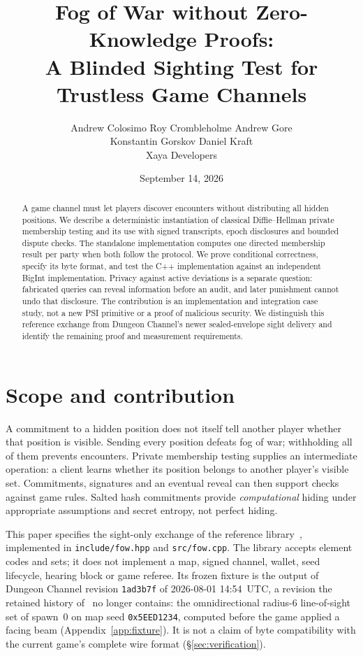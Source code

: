 \documentclass[11pt]{article}
\title{Fog of War without Zero-Knowledge Proofs:\\
A Blinded Sighting Test for Trustless Game Channels}
\author{Andrew Colosimo \quad Roy Crombleholme \quad Andrew Gore\\[3pt]
Konstantin Gorskov \quad Daniel Kraft\\[6pt]
\normalsize Xaya Developers}
\date{September 14, 2026}
\begin{document}
\maketitle

\begin{abstract}
A game channel must let players discover encounters without distributing all
hidden positions. We describe a deterministic instantiation of classical
Diffie--Hellman private membership testing and its use with signed transcripts,
epoch disclosures and bounded dispute checks. The standalone implementation
computes one directed membership result per party when both follow the
protocol. We prove conditional correctness, specify its byte format, and test
the C++ implementation against an independent BigInt implementation. Privacy
against active deviations is a separate question: fabricated queries can reveal
information before an audit, and later punishment cannot undo that disclosure.
The contribution is an implementation and integration case study, not a new
PSI primitive or a proof of malicious security. We distinguish this reference
exchange from Dungeon Channel's newer sealed-envelope sight delivery and
identify the remaining proof and measurement requirements.
\end{abstract}

\section{Scope and contribution}
\label{sec:scope}

A commitment to a hidden position does not itself tell another player whether
that position is visible. Sending every position defeats fog of war; withholding
all of them prevents encounters. Private membership testing supplies an
intermediate operation: a client learns whether its position belongs to another
player's visible set. Commitments, signatures and an eventual reveal can then
support checks against game rules. Salted hash commitments provide
\emph{computational} hiding under appropriate assumptions and secret entropy,
not perfect hiding.

This paper specifies the sight-only exchange of the reference
library~\cite{fowrepo}, implemented in \texttt{include/fow.hpp} and
\texttt{src/fow.cpp}. The library
accepts element codes and sets; it does not implement a map, signed channel,
wallet, seed lifecycle, hearing block or game referee. Its frozen fixture is
the output of Dungeon Channel revision \texttt{1ad3b7f} of 2026-08-01
14:54~UTC, a revision the retained history of~\cite{dchrepo} no longer
contains: the omnidirectional radius-6 line-of-sight set of spawn~0 on map
seed \texttt{0x5EED1234}, computed before the game applied a facing beam
(Appendix~\ref{app:fixture}). It is not a claim of byte compatibility with
the current game's complete wire format (\S\ref{sec:verification}).
\end{document}
